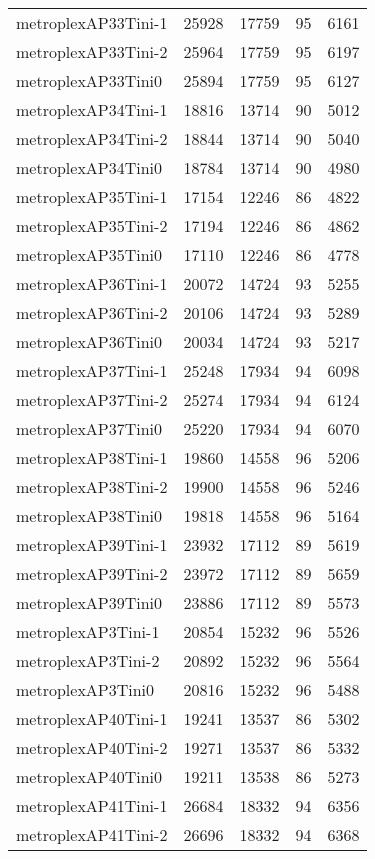 \begin{longtable}{lrrrr}
metroplexAP33Tini-1 & 25928 & 17759 & 95 & 6161 \\
metroplexAP33Tini-2 & 25964 & 17759 & 95 & 6197 \\
metroplexAP33Tini0 & 25894 & 17759 & 95 & 6127 \\
metroplexAP34Tini-1 & 18816 & 13714 & 90 & 5012 \\
metroplexAP34Tini-2 & 18844 & 13714 & 90 & 5040 \\
metroplexAP34Tini0 & 18784 & 13714 & 90 & 4980 \\
metroplexAP35Tini-1 & 17154 & 12246 & 86 & 4822 \\
metroplexAP35Tini-2 & 17194 & 12246 & 86 & 4862 \\
metroplexAP35Tini0 & 17110 & 12246 & 86 & 4778 \\
metroplexAP36Tini-1 & 20072 & 14724 & 93 & 5255 \\
metroplexAP36Tini-2 & 20106 & 14724 & 93 & 5289 \\
metroplexAP36Tini0 & 20034 & 14724 & 93 & 5217 \\
metroplexAP37Tini-1 & 25248 & 17934 & 94 & 6098 \\
metroplexAP37Tini-2 & 25274 & 17934 & 94 & 6124 \\
metroplexAP37Tini0 & 25220 & 17934 & 94 & 6070 \\
metroplexAP38Tini-1 & 19860 & 14558 & 96 & 5206 \\
metroplexAP38Tini-2 & 19900 & 14558 & 96 & 5246 \\
metroplexAP38Tini0 & 19818 & 14558 & 96 & 5164 \\
metroplexAP39Tini-1 & 23932 & 17112 & 89 & 5619 \\
metroplexAP39Tini-2 & 23972 & 17112 & 89 & 5659 \\
metroplexAP39Tini0 & 23886 & 17112 & 89 & 5573 \\
metroplexAP3Tini-1 & 20854 & 15232 & 96 & 5526 \\
metroplexAP3Tini-2 & 20892 & 15232 & 96 & 5564 \\
metroplexAP3Tini0 & 20816 & 15232 & 96 & 5488 \\
metroplexAP40Tini-1 & 19241 & 13537 & 86 & 5302 \\
metroplexAP40Tini-2 & 19271 & 13537 & 86 & 5332 \\
metroplexAP40Tini0 & 19211 & 13538 & 86 & 5273 \\
metroplexAP41Tini-1 & 26684 & 18332 & 94 & 6356 \\
metroplexAP41Tini-2 & 26696 & 18332 & 94 & 6368 \\

\end{longtable}
